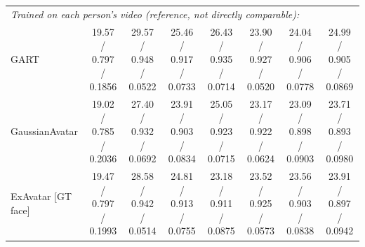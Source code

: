 \begin{tabular}{lccccccc}
\midrule
\multicolumn{8}{l}{\textit{Trained on each person's video (reference, not directly comparable):}} \\
GART & 19.57 / 0.797 / 0.1856 & 29.57 / 0.948 / 0.0522 & 25.46 / 0.917 / 0.0733 & 26.43 / 0.935 / 0.0714 & 23.90 / 0.927 / 0.0520 & 24.04 / 0.906 / 0.0778 & 24.99 / 0.905 / 0.0869 \\
GaussianAvatar & 19.02 / 0.785 / 0.2036 & 27.40 / 0.932 / 0.0692 & 23.91 / 0.903 / 0.0834 & 25.05 / 0.923 / 0.0715 & 23.17 / 0.922 / 0.0624 & 23.09 / 0.898 / 0.0903 & 23.71 / 0.893 / 0.0980 \\
ExAvatar [GT face] & 19.47 / 0.797 / 0.1993 & 28.58 / 0.942 / 0.0514 & 24.81 / 0.913 / 0.0755 & 23.18 / 0.911 / 0.0875 & 23.52 / 0.925 / 0.0573 & 23.56 / 0.903 / 0.0838 & 23.91 / 0.897 / 0.0942 \\
\bottomrule
\end{tabular}
